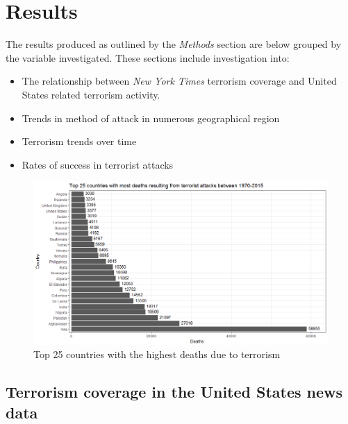 \documentclass[10pt,a4paper]{article}
\begin{document}
\section{Results}
The results produced as outlined by the \textit{Methods} section are below grouped by the variable investigated. These sections include investigation into:\\
\begin{itemize}
\item The relationship between \textit{New York Times} terrorism coverage and United States related terrorism activity.
\item Trends in method of attack in numerous geographical region
\item Terrorism trends over time
\item Rates of success in terrorist attacks 

\end{itemize}

\begin{center}
\begin{figure}[h!]
		
	\includegraphics[width=1\textwidth]{Plots/Top25countriesbydeaths.png}
	\caption{Top 25 countries with the highest deaths due to terrorism}

\end{figure}

\end{center}

\subsection{Terrorism coverage in the United States news data}
\end{document}
